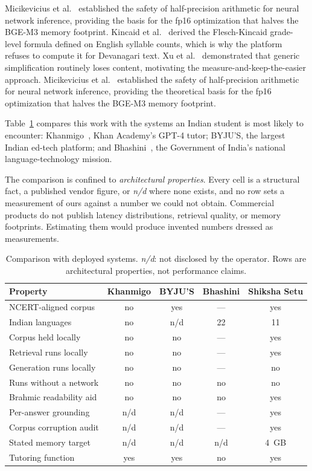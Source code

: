 \ifconf
Micikevicius et al.~\cite{b20} established the safety of half-precision arithmetic for neural network inference, providing the basis for the fp16 optimization that halves the BGE-M3 memory footprint.
\else
Kincaid et al.~\cite{b18} derived the Flesch-Kincaid grade-level formula defined on English syllable counts, which is why the platform refuses to compute it for Devanagari text. Xu et al.~\cite{b19} demonstrated that generic simplification routinely loses content, motivating the measure-and-keep-the-easier approach. Micikevicius et al.~\cite{b20} established the safety of half-precision arithmetic for neural network inference, providing the theoretical basis for the fp16 optimization that halves the BGE-M3 memory footprint.
\fi

\label{sec:comparison}
Table~\ref{tab:comparison} compares this work with the systems an Indian student is most likely to encounter: Khanmigo~\cite{b21}, Khan Academy's GPT-4 tutor; BYJU'S, the largest Indian ed-tech platform; and Bhashini~\cite{b22}, the Government of India's national language-technology mission.

The comparison is confined to \emph{architectural properties}. Every cell is a structural fact, a published vendor figure, or \emph{n/d} where none exists, and no row sets a measurement of ours against a number we could not obtain. Commercial products do not publish latency distributions, retrieval quality, or memory footprints. Estimating them would produce invented numbers dressed as measurements.

\begin{table}
\caption{Comparison with deployed systems. \emph{n/d}: not disclosed by the operator. Rows are architectural properties, not performance claims.}
\label{tab:comparison}
\centering
\footnotesize
\setlength{\tabcolsep}{3pt}
\begin{tabular}{@{}lcccc@{}}
\toprule
\textbf{Property} & \textbf{Khanmigo} & \textbf{BYJU'S} & \textbf{Bhashini} & \textbf{Shiksha Setu} \\
\midrule
NCERT-aligned corpus     & no  & yes & ---  & yes \\
Indian languages         & no  & n/d & 22   & 11 \\
Corpus held locally      & no  & no  & ---  & yes \\
Retrieval runs locally   & no  & no  & ---  & yes \\
Generation runs locally  & no  & no  & ---  & no  \\
Runs without a network   & no  & no  & no   & no  \\
Brahmic readability aid  & no  & no  & no   & yes \\
Per-answer grounding     & n/d & n/d & ---  & yes \\
Corpus corruption audit  & n/d & n/d & ---  & yes \\
Stated memory target     & n/d & n/d & n/d  & 4~GB \\
Tutoring function        & yes & yes & no   & yes \\
\bottomrule
\end{tabular}
\end{table}

